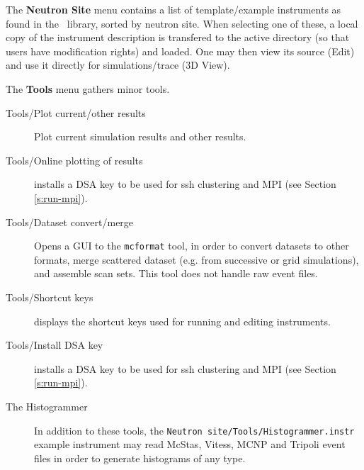 \noindent The {\bf Neutron Site} menu contains a list of
template/example instruments as found in the \MCS\ library, sorted by
neutron site. When selecting one of these, a local copy of the
instrument description is transfered to the active directory (so that
users have modification rights) and loaded. One may then view its source (Edit) and use it directly for simulations/trace (3D View).


\noindent The {\bf Tools} menu gathers minor tools.
\begin{description}
\item[Tools/Plot current/other results] Plot current simulation results and other results.
\item[Tools/Online plotting of results] installs a DSA key to be used for ssh clustering and MPI (see Section \ref{s:run-mpi}).
\item[Tools/Dataset convert/merge] Opens a GUI to the \verb+mcformat+ tool, in order to convert datasets to other formats, merge scattered dataset (e.g. from successive or grid simulations), and assemble scan sets. This tool does not handle raw event files.
\item[Tools/Shortcut keys] displays the shortcut keys used for running and editing instruments.
\item[Tools/Install DSA key] installs a DSA key to be used for ssh clustering and MPI (see Section \ref{s:run-mpi}).
\item[The Histogrammer] In addition to these tools, the \verb+Neutron site/Tools/Histogrammer.instr+ example instrument may read McStas, Vitess, MCNP and Tripoli event files in order to generate histograms of any type.
\end{description}


